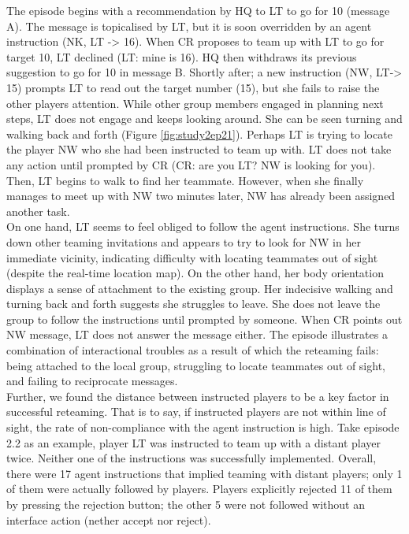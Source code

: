 The episode begins with a recommendation by HQ to LT to go for 10 (message A). The message is topicalised by LT, but it is soon overridden by an agent instruction (NK, LT -> 16). When CR proposes to team up with LT to go for target 10, LT declined (LT: mine is 16). HQ then withdraws its previous suggestion to go for 10 in message B. Shortly after; a new instruction (NW, LT-> 15) prompts LT to read out the target number (15), but she fails to raise the other players attention. While other group members engaged in planning next steps, LT does not engage and keeps looking around. She can be seen turning and walking back and forth (Figure \ref{fig:study2ep21}). Perhaps LT is trying to locate the player NW who she had been instructed to team up with. LT does not take any action until prompted by CR (CR: are you LT? NW is looking for you). Then, LT begins to walk to find her teammate. However, when she finally manages to meet up with NW two minutes later, NW has already been assigned another task. \\

On one hand, LT seems to feel obliged to follow the agent instructions. She turns down other teaming invitations and appears to try to look for NW in her immediate vicinity, indicating difficulty with locating teammates out of sight (despite the real-time location map). On the other hand, her body orientation displays a sense of attachment to the existing group. Her indecisive walking and turning back and forth suggests she struggles to leave. She does not leave the group to follow the instructions until prompted by someone. When CR points out NW message, LT does not answer the message either. The episode illustrates a combination of interactional troubles as a result of which the reteaming fails: being attached to the local group, struggling to locate teammates out of sight, and failing to reciprocate messages. \\

Further, we found the distance between instructed players to be a key factor in successful reteaming. That is to say, if instructed players are not within line of sight, the rate of non-compliance with the agent instruction is high. Take episode 2.2 as an example, player LT was instructed to team up with a distant player twice. Neither one of the instructions was successfully implemented. Overall, there were 17 agent instructions that implied teaming with distant players; only 1 of them were actually followed by players. Players explicitly rejected 11 of them by pressing the rejection button; the other 5 were not followed without an interface action (nether accept nor reject).\\

